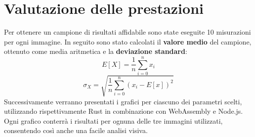 \section{Valutazione delle prestazioni}
Per ottenere un campione di risultati affidabile sono state eseguite 10 misurazioni per ogni immagine.
In seguito sono stato calcolati il \textbf{valore medio} del campione, ottenuto come media aritmetica e la \textbf{deviazione standard}:
\begin{equation*}
    E[X]=\frac{1}{n}\sum_{i=0}^{n}x_i
\end{equation*}
\begin{equation*}
    \sigma_X = \sqrt{\frac{1}{n}\sum_{i=0}^{n}(x_i-E[x])^2}
\end{equation*}
Successivamente verranno presentati i grafici per ciascuno dei parametri scelti, utilizzando rispettivamente Rust in combinazione con WebAssembly e Node.js. Ogni grafico conterrà i risultati per ognuna delle tre immagini utilizzati, consentendo così anche una facile analisi visiva.
